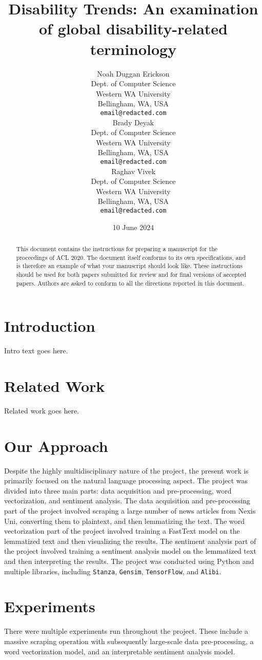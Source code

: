 \documentclass[11pt,a4paper]{article}
\title{Disability Trends: An examination of global disability-related terminology}
\author{Noah Duggan Erickson \\
  Dept. of Computer Science \\
  Western WA University \\
  Bellingham, WA, USA \\
  \texttt{email@redacted.com} \\\And
  Brady Deyak \\
  Dept. of Computer Science \\
  Western WA University \\
  Bellingham, WA, USA \\
  \texttt{email@redacted.com} \\\And
  Raghav Vivek \\
  Dept. of Computer Science \\
  Western WA University \\
  Bellingham, WA, USA \\
  \texttt{email@redacted.com} \\}
\date{10 June 2024}
\begin{document}
\maketitle
\begin{abstract}
This document contains the instructions for preparing a manuscript for the proceedings of ACL 2020.
The document itself conforms to its own specifications, and is therefore an example of what your manuscript should look like.
These instructions should be used for both papers submitted for review and for final versions of accepted papers.
Authors are asked to conform to all the directions reported in this document.
\end{abstract}

\section{Introduction}
Intro text goes here.

\section{Related Work}
Related work goes here.

\section{Our Approach}
Despite the highly multidisciplinary nature of the project, the present work is primarily focused on the natural language processing aspect. The project was divided into three main parts: data acquisition and pre-processing, word vectorization, and sentiment analysis. The data acquisition and pre-processing part of the project involved scraping a large number of news articles from Nexis Uni, converting them to plaintext, and then lemmatizing the text. The word vectorization part of the project involved training a FastText model on the lemmatized text and then visualizing the results. The sentiment analysis part of the project involved training a sentiment analysis model on the lemmatized text and then interpreting the results. The project was conducted using Python and multiple libraries, including \texttt{Stanza}, \texttt{Gensim}, \texttt{TensorFlow}, and \texttt{Alibi}.

\section{Experiments}
There were multiple experiments run throughout the project. These include a massive scraping operation with subsequently large-scale data pre-processing, a word vectorization model, and an interpretable sentiment analysis model.
\end{document}
